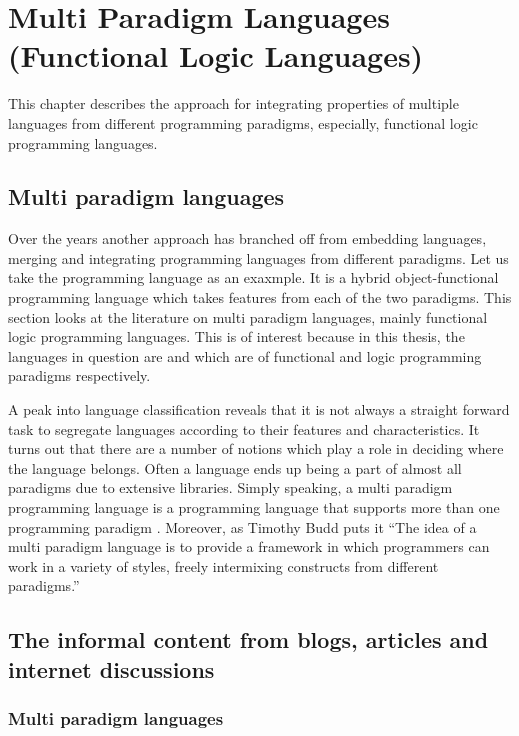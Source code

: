 \documentclass[thesis-solanki.tex]{subfiles}
\begin{document}
\chapter{Multi Paradigm Languages (Functional Logic Languages)}\label{chap:multiparadigm}


This chapter describes the approach for integrating properties of multiple languages from different programming
paradigms, especially, functional logic programming languages.

\section{Multi paradigm languages}
Over the years another approach has branched off from embedding languages, merging and integrating programming
languages from different paradigms.
Let us take the  programming language \cite{website:scala} as an exaxmple. It is a hybrid
object-functional programming language which takes features from each of the two paradigms.
This section looks at the literature on multi paradigm languages, mainly functional logic programming
languages. This is of interest because in this thesis, the languages in question are  
and  which are of functional and logic programming paradigms respectively.

A peak into language classification reveals that it is not always a straight forward task to segregate languages
according to their features and characteristics.
It turns out that there are a number of notions which play a role in deciding where the language belongs.
Often a language ends up being a part of almost all paradigms due to extensive libraries.
Simply speaking, a multi paradigm programming language is a programming language that supports more than one
programming paradigm \cite{Krishnamurthi:2008:TPL:1480828.1480846}. Moreover, as Timothy Budd puts it
\cite{website:wikimultiparadigm} ``The idea of a multi paradigm language is to provide a framework in which
programmers can work in a variety of styles, freely intermixing constructs from different paradigms.''


\section{The informal content from blogs, articles and internet discussions}
  
\subsection{Multi paradigm languages}
\end{document}
